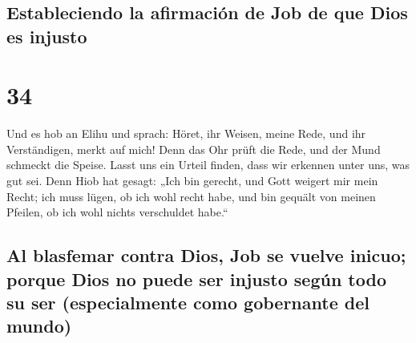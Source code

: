 \hypertarget{estableciendo-la-afirmaciuxf3n-de-job-de-que-dios-es-injusto}{%
\subsection{Estableciendo la afirmación de Job de que Dios es
injusto}\label{estableciendo-la-afirmaciuxf3n-de-job-de-que-dios-es-injusto}}

\hypertarget{section-33}{%
\section{34}\label{section-33}}

 Und es hob an Elihu und sprach:  Höret, ihr
Weisen, meine Rede, und ihr Verständigen, merkt auf mich! 
Denn das Ohr prüft die Rede, und der Mund schmeckt die Speise.
 Lasst uns ein Urteil finden, dass wir erkennen unter uns,
was gut sei.  Denn Hiob hat gesagt: „Ich bin gerecht, und
Gott weigert mir mein Recht;  ich muss lügen, ob ich wohl
recht habe, und bin gequält von meinen Pfeilen, ob ich wohl nichts
verschuldet habe.``

\hypertarget{al-blasfemar-contra-dios-job-se-vuelve-inicuo-porque-dios-no-puede-ser-injusto-seguxfan-todo-su-ser-especialmente-como-gobernante-del-mundo}{%
\subsection{Al blasfemar contra Dios, Job se vuelve inicuo; porque Dios
no puede ser injusto según todo su ser (especialmente como gobernante
del
mundo)}\label{al-blasfemar-contra-dios-job-se-vuelve-inicuo-porque-dios-no-puede-ser-injusto-seguxfan-todo-su-ser-especialmente-como-gobernante-del-mundo}}

